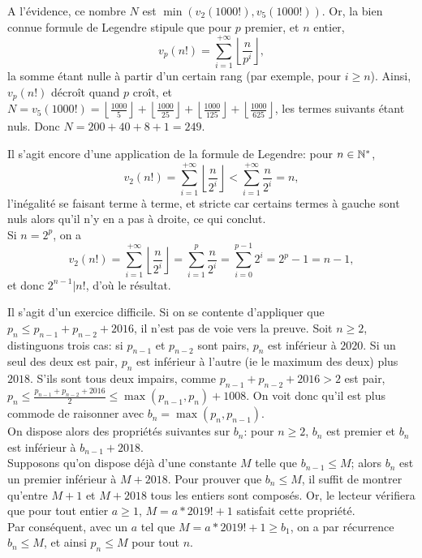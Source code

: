 \begin{sol}[14]
		A l'\'evidence, ce nombre $N$ est $\min(v_2(1000!),v_5(1000!))$. Or, la bien connue formule de Legendre stipule que pour $p$ premier, et $n$ entier, \[v_p(n!)=\sum \limits_{i=1}^{+\infty} \left\lfloor \frac{n}{p^i}\right\rfloor,\] la somme \'etant nulle \`a partir d'un certain rang (par exemple, pour $i \geq n$).
		Ainsi, $v_p(n!)$ d\'ecro\^it quand $p$ cro\^it, et $N=v_5(1000!)=\left\lfloor \frac{1000}{5}\right\rfloor+\left\lfloor \frac{1000}{25}\right\rfloor + \left\lfloor \frac{1000}{125}\right\rfloor + \left\lfloor \frac{1000}{625} \right\rfloor$, les termes suivants \'etant nuls. Donc $N=200+40+8+1=249$.
\end{sol}

\begin{sol}[15]
		Il s'agit encore d'une application de la formule de Legendre: pour $n \in \mathbb{N}^*$, 
		\[v_2(n!)=\sum_{i=1}^{+\infty}{\left\lfloor \frac{n}{2^i}\right\rfloor} < \sum_{i=1}^{+\infty}{\frac{n}{2^i}} = n,\]
		l'in\'egalit\'e se faisant terme \`a terme, et stricte car certains termes \`a gauche sont nuls alors qu'il n'y en a pas \`a droite, ce qui conclut. \\
		Si $n=2^p$, on a \[v_2(n!)=\sum_{i=1}^{+\infty}{\left\lfloor \frac{n}{2^i} \right\rfloor}=\sum_{i=1}^{p}{\frac{n}{2^i}}=\sum_{i=0}^{p-1}{2^i}=2^p-1=n-1, \]
		et donc $2^{n-1} | n!$, d'o\`u le r\'esultat.
\end{sol}

\begin{sol}[16]
		Il s'agit d'un exercice difficile. Si on se contente d'appliquer que $p_n \leq p_{n-1}+p_{n-2}+2016$, il n'est pas de voie vers la preuve. Soit $n \geq 2$, distinguons trois cas: si $p_{n-1}$ et $p_{n-2}$ sont pairs, $p_n$ est inf\'erieur \`a $2020$. Si un seul des deux est pair, $p_n$ est inf\'erieur \`a l'autre (ie le maximum des deux) plus $2018$. S'ils sont tous deux impairs, comme $p_{n-1}+p_{n-2}+2016 > 2$ est pair, $p_n \leq \frac{p_{n-1}+p_{n-2}+2016}{2} \leq \max(p_{n-1},p_n)+1008$. On voit donc qu'il est plus commode de raisonner avec $b_n=\max(p_n,p_{n-1})$. \\
		On dispose alors des propri\'et\'es suivantes sur $b_n$: pour $n \geq 2$, $b_n$ est premier et $b_n$ est inf\'erieur \`a $b_{n-1}+2018$. \\
		Supposons qu'on dispose d\'ej\`a d'une constante $M$ telle que $b_{n-1} \leq M$; alors $b_n$ est un premier inf\'erieur \`a $M+2018$. Pour prouver que $b_n \leq M$, il suffit de montrer qu'entre $M+1$ et $M+2018$ tous les entiers sont compos\'es. Or, le lecteur v\'erifiera que pour tout entier $a \geq 1$, $M=a*2019!+1$ satisfait cette propri\'et\'e. \\
		Par cons\'equent, avec un $a$ tel que $M=a*2019!+1 \geq b_1$, on a par r\'ecurrence $b_n \leq M$, et ainsi $p_n \leq M$ pour tout $n$.
		
\end{sol}

